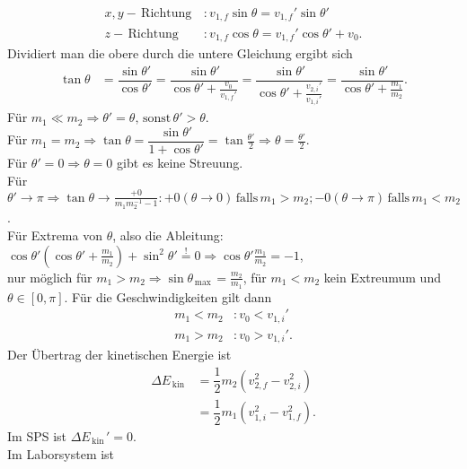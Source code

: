 \documentclass[a4paper,12pt]{article}
\numberwithin{equation}{section}
\begin{document}
\begin{align*}
        x,y-\,\text{Richtung}\,&:v_{1,f}\sin \theta =v_{1,f}'\sin \theta '\\
        z-\,\text{Richtung}\,&:v_{1,f}\cos \theta =v_{1,f}'\cos \theta '+v_0
.\end{align*}
Dividiert man die obere durch die untere Gleichung ergibt sich
\begin{align*}
        \tan \theta &=\dfrac{\sin \theta '}{\cos \theta '}=\dfrac{\sin \theta '}{\cos \theta '+\tfrac{v_0}{v_{1,f}'}}=\dfrac{\sin \theta '}{\cos \theta '+\tfrac{v_{2,i}'}{v_{1,i}'}}=\dfrac{\sin \theta '}{\cos \theta '+\tfrac{m_1}{m_2}}
.\end{align*}
Für $m_1\ll m_2\Rightarrow \theta '=\theta ,\,\text{sonst}\,\theta '>\theta $. \\
Für $m_1=m_2\Rightarrow \tan \theta =\dfrac{\sin \theta '}{1+\cos \theta '}=\tan \tfrac{\theta '}{2}\Rightarrow \theta =\tfrac{\theta '}{2}$.\\
Für $\theta '=0\Rightarrow \theta =0$ gibt es keine Streuung.\\
Für $\theta '\rightarrow \pi \Rightarrow \tan \theta \rightarrow \tfrac{+0}{m_1m_2^{-1}-1}:+0\left(\theta \rightarrow 0\right)\,\text{falls}\,m_1>m_2;-0\left(\theta \rightarrow \pi \right)\,\text{falls}\,m_1<m_2$.\\
Für Extrema von $\theta $, also die Ableitung: $\cos \theta '\left(\cos \theta '+\tfrac{m_1}{m_2}\right)+\sin ^2\theta '\stackrel{!}{=}0\Rightarrow \cos \theta '\tfrac{m_1}{m_2}=-1$,\\\indent
nur möglich für $m_1>m_2\Rightarrow \sin \theta _{\,\text{max}\,}=\tfrac{m_2}{m_1}$, für $m_1<m_2$ kein Extreumum und $\theta  \in \left[0,\pi \right]$. Für die Geschwindigkeiten gilt dann
\begin{align*}
        m_1<m_2&:v_0<v_{1,i}'\\
        m_1>m_2&:v_0>v_{1,i}'
.\end{align*}
Der Übertrag der kinetischen Energie ist 
\begin{align*}
        \Delta E_{\,\text{kin}\,}&=\dfrac{1}{2}m_2\left(v_{2,f}^2-v_{2,i}^2\right)\\
                                 &=\dfrac{1}{2}m_1\left(v_{1,i}^2-v_{1,f}^2\right)
.\end{align*}
Im SPS ist $\Delta E_{\,\text{kin}\,}'=0$.\\
Im Laborsystem ist
\end{document}

